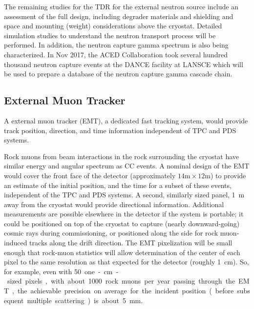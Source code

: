 The remaining studies for the TDR for the external neutron source include an assessment of the full design, including degrader materials and shielding and space and mounting (weight) considerations above the cryostat. Detailed simulation studies to understand the neutron transport process will be performed. In addition, the neutron capture gamma spectrum is also being characterized. In Nov 2017, the ACED Collaboration took several hundred thousand neutron capture events at the DANCE facility at LANSCE which will be used to prepare a database of the neutron capture gamma cascade chain. 

\subsection{External Muon Tracker} %
\label{sec:calibemt}

A external muon tracker (EMT), a dedicated fast tracking system, would provide track position, direction, and time information independent of TPC and PDS systems.

Rock muons from beam interactions in the rock surrounding the cryostat have similar energy  and angular  spectrum as CC \numu 
events. A nominal design of the EMT would cover the front face of the detector (approximately $14\textrm{m} \times 12\textrm{m}$) to provide an estimate of the initial position, and the time for a subset of these events, independent of the TPC and PDS systems. A second, similarly sized panel, \SI{1}{\m} away from the cryostat would provide directional information. 
Additional measurements are possible elsewhere in the detector if the system is portable; it could be positioned on top of the cryostat to capture (nearly downward-going) cosmic rays during commissioning, or positioned along the side for rock muon-induced tracks along the drift direction. The EMT  pixelization will be small enough that rock-muon statistics will allow  determination of the center of each pixel to the same resolution as that expected for the detector (roughly \SI{1}{\cm}). So, for example, even with \SI{50} one-\si{\cm}-sized pixels,  with about \num{1000} rock muons per year passing through the EMT, the achievable precision  on average  for the incident position (before subsequent multiple scattering) is about \SI{5}{\milli\m}. 


